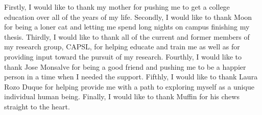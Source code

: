 Firstly, I would like to thank my mother for pushing me to get a college education over all of the years of my life. Secondly, I would like to thank Moon for being a loner cat and letting me spend long nights on campus finishing my thesis. Thirdly, I would like to thank all of the current and former members of my research group, CAPSL, for helping educate and train me as well as for providing input toward the pursuit of my research. Fourthly, I would like to thank Jose Monsalve for being a good friend and pushing me to be a happier person in a time when I needed the support. Fifthly, I would like to thank Laura Rozo Duque for helping provide me with a path to exploring myself as a unique individual human being. Finally, I would like to thank Muffin for his chews straight to the heart.

